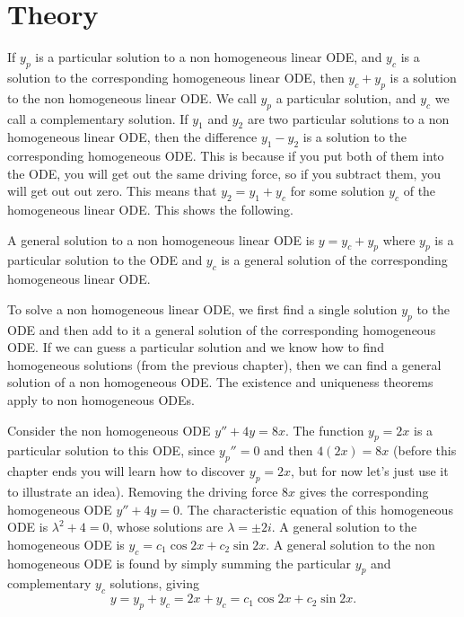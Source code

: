\section{Theory}
If $y_p$ is a particular solution to a non homogeneous linear ODE, and $y_c$ is a solution to the corresponding homogeneous linear ODE, then $y_c+y_p$ is a solution to the non homogeneous linear ODE. We call $y_p$ a particular solution, and $y_c$ we call a complementary solution. If $y_1$ and $y_2$ are two particular solutions to a non homogeneous linear ODE, then the difference $y_1-y_2$ is a solution to the corresponding homogeneous ODE. This is because if you put both of them into the ODE, you will get out the same driving force, so if you subtract them, you will get out out zero. This means that $y_2=y_1+y_c$ for some solution $y_c$ of the homogeneous linear ODE. This shows the following.
\begin{theorem}
A general solution to a non homogeneous linear ODE is $y=y_c+y_p$ where $y_p$ is a particular solution to the ODE and $y_c$ is a general solution of the corresponding homogeneous linear ODE. 
\end{theorem}
To solve a non homogeneous linear ODE, we first find a single solution $y_p$ to the ODE and then add to it a general solution of the corresponding homogeneous ODE. If we can guess a particular solution and we know how to find homogeneous solutions (from the previous chapter), then we can find a general solution of a non homogeneous ODE. The existence and uniqueness theorems apply to non homogeneous ODEs.

\begin{example} Consider the non homogeneous ODE $y''+4y = 8x$. The function $y_p=2x$ is a particular solution to this ODE, since $y_p''=0$ and then $4(2x)=8x$ (before this chapter ends you will learn how to discover $y_p=2x$, but for now let's just use it to illustrate an idea). Removing the driving force $8x$ gives the corresponding homogeneous ODE $y''+4y=0$.  The characteristic equation of this homogeneous ODE is $\lambda^2+4=0$, whose solutions are $\lambda =\pm 2i$.  A general solution to the homogeneous ODE is $y_c = c_1 \cos 2x +c_2\sin 2x$. A general solution to the non homogeneous ODE is found by simply summing the particular $y_p$ and complementary $y_c$ solutions, giving $$y = y_p+y_c = 2x+y_c = c_1 \cos 2x +c_2\sin 2x.$$
\end{example}

